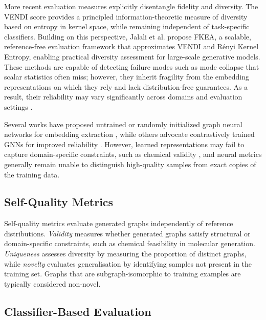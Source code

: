 More recent evaluation measures explicitly disentangle fidelity and diversity.
The VENDI score \citep{friedman2023vendi} provides a principled information-theoretic
measure of diversity based on entropy in kernel space, while remaining independent
of task-specific classifiers. Building on this perspective, Jalali et al.
\citep{jalali2024fkea} propose FKEA, a scalable, reference-free evaluation framework
that approximates VENDI and R\'enyi Kernel Entropy, enabling practical diversity
assessment for large-scale generative models. These methods are capable of detecting
failure modes such as mode collapse that scalar statistics often miss; however, they
inherit fragility from the embedding representations on which they rely and lack
distribution-free guarantees. As a result, their reliability may vary significantly
across domains and evaluation settings \citep{parmar2022aliased,betzalel2022study}.

Several works have proposed untrained or randomly initialized graph neural networks
for embedding extraction \citep{thompson2022evaluationmetricsgraphgenerative}, while
others advocate contrastively trained GNNs for improved reliability
\citep{shirzad2022evaluatinggraphgenerativemodels}. However, learned representations
may fail to capture domain-specific constraints, such as chemical validity
\citep{hess2018chemical}, and neural metrics generally remain unable to distinguish
high-quality samples from exact copies of the training data.



\subsection{Self-Quality Metrics}

Self-quality metrics evaluate generated graphs independently of reference distributions. \emph{Validity} measures whether generated graphs satisfy structural or domain-specific constraints, such as chemical feasibility in molecular generation. \emph{Uniqueness} assesses diversity by measuring the proportion of distinct graphs, while \emph{novelty} evaluates generalisation by identifying samples not present in the training set. Graphs that are subgraph-isomorphic to training examples are typically considered non-novel.

\subsection{Classifier-Based Evaluation}


